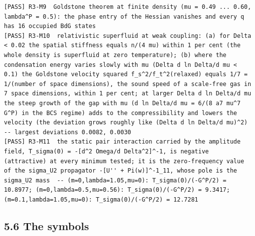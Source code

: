 \documentclass[
  10pt,
]{article}
\begin{document}
\begin{verbatim}
[PASS] R3-M9  Goldstone theorem at finite density (mu = 0.49 ... 0.60, lambda^P = 0.5): the phase entry of the Hessian vanishes and every q has 16 occupied BdG states
[PASS] R3-M10  relativistic superfluid at weak coupling: (a) for Delta < 0.02 the spatial stiffness equals n/(4 mu) within 1 per cent (the whole density is superfluid at zero temperature); (b) where the condensation energy varies slowly with mu (Delta d ln Delta/d mu < 0.1) the Goldstone velocity squared f_s^2/f_t^2(relaxed) equals 1/7 = 1/(number of space dimensions), the sound speed of a scale-free gas in 7 space dimensions, within 1 per cent; at larger Delta d ln Delta/d mu the steep growth of the gap with mu (d ln Delta/d mu = 6/(8 a7 mu^7 G^P) in the BCS regime) adds to the compressibility and lowers the velocity (the deviation grows roughly like (Delta d ln Delta/d mu)^2)  -- largest deviations 0.0082, 0.0030
[PASS] R3-M11  the static pair interaction carried by the amplitude field, T_sigma(0) = -[d^2 Omega/d Delta^2]^-1, is negative (attractive) at every minimum tested; it is the zero-frequency value of the sigma_U2 propagator -[U'' + Pi(w)]^-1_11, whose pole is the sigma_U2 mass  -- (m=0,lambda=1.05,mu=0): T_sigma(0)/(-G^P/2) = 10.8977; (m=0,lambda=0.5,mu=0.56): T_sigma(0)/(-G^P/2) = 9.3417; (m=0.1,lambda=1.05,mu=0): T_sigma(0)/(-G^P/2) = 12.7281
\end{verbatim}

\hypertarget{the-symbols}{%
\subsection{5.6 The symbols}\label{the-symbols}}
\end{document}
